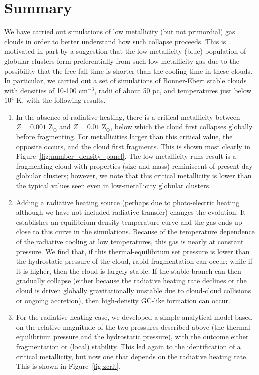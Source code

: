 \documentclass[useAMS,usenatbib]{mn2e}
\begin{document}

\section{Summary}

We have carried out simulations of low metallicity (but not primordial) gas clouds in order to better understand  how such collapse proceeds.  This is motivated in part by a suggestion that the low-metallicity (blue) population of globular clusters form preferentially from such low metallicity gas due to the possibility that the free-fall time is shorter than the cooling time in these clouds.  In particular, we carried out a set of simulations of Bonner-Ebert stable clouds with densities of 10-100 cm$^{-3}$, radii of about 50 pc, and temperatures just below $10^4$ K, with the following results.

\begin{enumerate}

\item In the absence of radiative heating, there is a critical metallicity between $Z=0.001$ Z$_\odot$ and $Z=0.01$ Z$_\odot$, below which the cloud first collapses globally before fragmenting.  For metallicities larger than this critical value, the opposite occurs, and the cloud first fragments.  This is shown most clearly in Figure~\ref{fig:number_density_panel}.  The low metallicity runs result is a fragmenting cloud with properties (size and mass) reminiscent of present-day globular clusters; however, we note that this critical metallicity is lower than the typical values seen even in low-metallicity globular clusters.

\item Adding a radiative heating source (perhaps due to photo-electric heating although we have not included radiative transfer) changes the evolution.  It establishes an equilibrium density-temperature curve and the gas ends up close to this curve in the simulations.  Because of the temperature dependence of the radiative cooling at low temperatures, this gas is nearly at constant pressure.  We find that, if this thermal-equilibrium set pressure is lower than the hydrostatic pressure of the cloud, rapid fragmentation can occur; while if it is higher, then the cloud is largely stable.  If the stable branch can then gradually collapse (either because the radiative heating rate declines or the cloud is driven globally gravitationally unstable due to cloud-cloud collisions or ongoing accretion), then high-density GC-like formation can occur.

\item For the radiative-heating case, we developed a simple analytical model based on the relative magnitude of the two pressures described above (the thermal-equilibrium pressure and the hydrostatic pressure), with the outcome either fragmentation or (local) stability.  This led again to the identification of a critical metallicity, but now one that depends on the radiative heating rate.  This is shown in Figure~\ref{fig:zcrit}.

\end{enumerate}
\end{document}
